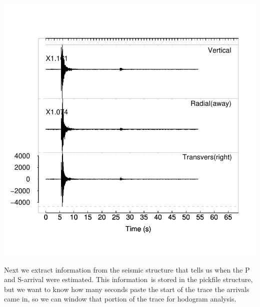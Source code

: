 \documentclass{article}
\begin{document}
\begin{Schunk}
\end{Schunk}
\includegraphics{hodo-009}

Next we extract information from the seismic structure that
tells us when the P and S-arrival were estimated.  This information\
is stored in the pickfile structure,
but we want to know how many seconds paste the start of the trace the
arrivals came in, so we can window that portion of the trace
for hodogram analysis.
\end{document}
